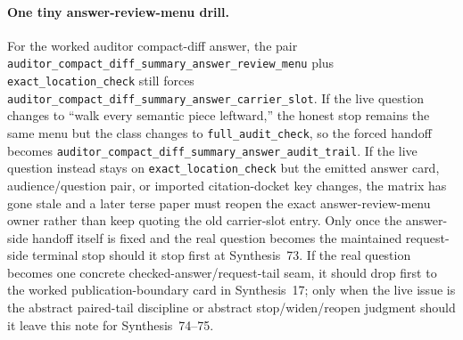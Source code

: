 \documentclass[11pt]{article}
\begin{document}
\paragraph{One tiny answer-review-menu drill.}
For the worked auditor compact-diff answer, the pair \nolinkurl{auditor_compact_diff_summary_answer_review_menu} plus \nolinkurl{exact_location_check} still forces \nolinkurl{auditor_compact_diff_summary_answer_carrier_slot}. If the live question changes to ``walk every semantic piece leftward,'' the honest stop remains the same menu but the class changes to \nolinkurl{full_audit_check}, so the forced handoff becomes \nolinkurl{auditor_compact_diff_summary_answer_audit_trail}. If the live question instead stays on \nolinkurl{exact_location_check} but the emitted answer card, audience/question pair, or imported citation-docket key changes, the matrix has gone stale and a later terse paper must reopen the exact answer-review-menu owner rather than keep quoting the old carrier-slot entry. Only once the answer-side handoff itself is fixed and the real question becomes the maintained request-side terminal stop should it stop first at Synthesis~73. If the real question becomes one concrete checked-answer/request-tail seam, it should drop first to the worked publication-boundary card in Synthesis~17; only when the live issue is the abstract paired-tail discipline or abstract stop/widen/reopen judgment should it leave this note for Synthesis~74--75.\cite{series:workedexample}
\end{document}
